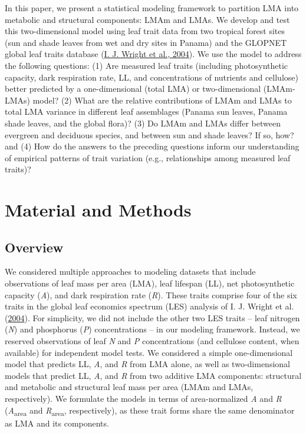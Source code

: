 \documentclass[
  12pt,
  a4paper,
,tablecaptionabove
]{scrartcl}
\begin{document}
In this paper, we present a statistical modeling framework to partition
LMA into metabolic and structural components: LMAm and LMAs. We develop
and test this two-dimensional model using leaf trait data from two
tropical forest sites (sun and shade leaves from wet and dry sites in
Panama) and the GLOPNET global leaf traits database
(\protect\hyperlink{ref-Wright2004a}{I. J. Wright et al., 2004}). We use
the model to address the following questions: (1) Are measured leaf
traits (including photosynthetic capacity, dark respiration rate, LL,
and concentrations of nutrients and cellulose) better predicted by a
one-dimensional (total LMA) or two-dimensional (LMAm-LMAs) model? (2)
What are the relative contributions of LMAm and LMAs to total LMA
variance in different leaf assemblages (Panama sun leaves, Panama shade
leaves, and the global flora)? (3) Do LMAm and LMAs differ between
evergreen and deciduous species, and between sun and shade leaves? If
so, how? and (4) How do the answers to the preceding questions inform
our understanding of empirical patterns of trait variation (e.g.,
relationships among measured leaf traits)?

\hypertarget{material-and-methods}{%
\section{Material and Methods}\label{material-and-methods}}

\hypertarget{overview}{%
\subsection{Overview}\label{overview}}

We considered multiple approaches to modeling datasets that include
observations of leaf mass per area (LMA), leaf lifespan (LL), net
photosynthetic capacity (\emph{A}), and dark respiration rate
(\emph{R}). These traits comprise four of the six traits in the global
leaf economics spectrum (LES) analysis of I. J. Wright et al.
(\protect\hyperlink{ref-Wright2004a}{2004}). For simplicity, we did not
include the other two LES traits -- leaf nitrogen (\emph{N}) and
phosphorus (\emph{P}) concentrations -- in our modeling framework.
Instead, we reserved observations of leaf \emph{N} and \emph{P}
concentrations (and cellulose content, when available) for independent
model tests. We considered a simple one-dimensional model that predicts
LL, \emph{A}, and \emph{R} from LMA alone, as well as two-dimensional
models that predict LL, \emph{A}, and \emph{R} from two additive LMA
components: structural and metabolic and structural leaf mass per area
(LMAm and LMAs, respectively). We formulate the models in terms of
area-normalized \emph{A} and \emph{R} (\emph{A}\textsubscript{area} and
\emph{R}\textsubscript{area}, respectively), as these trait forms share
the same denominator as LMA and its components.
\end{document}
